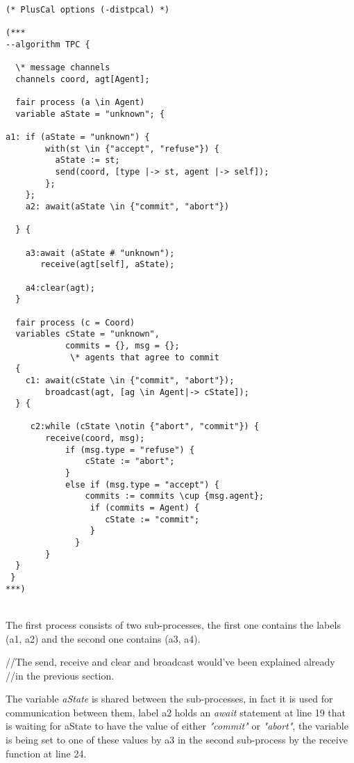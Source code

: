 \documentclass{thesul}
\begin{document}
\hfill\\\hfill\\
\begin{lstlisting}[caption = Distributed PlusCal Sub-Processes, frame = tlrb, firstnumber = 1]
    
(* PlusCal options (-distpcal) *)

(***
--algorithm TPC {
 
  \* message channels
  channels coord, agt[Agent];
     
  fair process (a \in Agent)
  variable aState = "unknown"; {

a1: if (aState = "unknown") {
        with(st \in {"accept", "refuse"}) {
          aState := st;
          send(coord, [type |-> st, agent |-> self]);
        };
    };
    a2: await(aState \in {"commit", "abort"})
    
  } {
    
    a3:await (aState # "unknown");
       receive(agt[self], aState); 
       
    a4:clear(agt);
  }

  fair process (c = Coord) 
  variables cState = "unknown",
            commits = {}, msg = {};
             \* agents that agree to commit
  {
    c1: await(cState \in {"commit", "abort"});    
        broadcast(agt, [ag \in Agent|-> cState]);
  } {
        
     c2:while (cState \notin {"abort", "commit"}) {
        receive(coord, msg);
            if (msg.type = "refuse") {
                cState := "abort";
            }
            else if (msg.type = "accept") {
                commits := commits \cup {msg.agent};
                 if (commits = Agent) {
                    cState := "commit";
                 }
              }
        }
  }
 }
***)
\end{lstlisting}

\hfill\\

The first process consists of two sub-processes, the first one contains the labels (a1, a2) and the second one contains (a3, a4).

//The send, receive and clear and broadcast would've been explained already //in the previous section.

The variable \textit{aState} is shared between the sub-processes, in fact it is used for communication between them, label a2 holds an \textit{await} statement at line 19 that is waiting for aState to have the value of either \textit{"commit"} or \textit{"abort"}, the variable is being set to one of these values by a3 in the second sub-process by the receive function at line 24.
\end{document}
